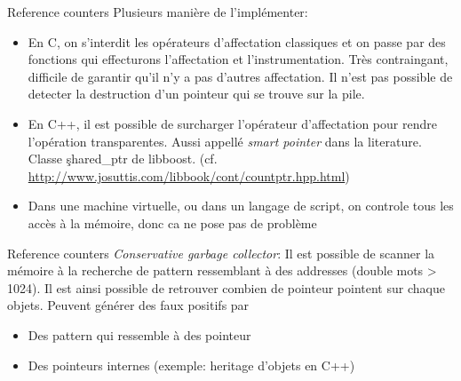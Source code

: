 \begin{frame}[fragile=singleslide]{Reference counters}
  Plusieurs manière de l'implémenter:
  \begin{itemize}
  \item En C, on s'interdit les opérateurs d'affectation classiques et
    on  passe  par  des  fonctions qui  effecturons  l'affectation  et
    l'instrumentation.  Très contraingant, difficile de garantir qu'il
    n'y a pas d'autres affectation.  Il n'est pas possible de detecter
    la destruction d'un pointeur qui se trouve sur la pile.
  \item   En  C++,   il   est  possible   de  surcharger   l'opérateur
    d'affectation   pour  rendre  l'opération   transparentes.   Aussi
    appellé   \emph{smart  pointer}   dans   la  literature.    Classe
    \c{shared_ptr}            de            libboost.             (cf.
    \url{http://www.josuttis.com/libbook/cont/countptr.hpp.html})
  \item Dans une  machine virtuelle, ou dans un  langage de script, on
    controle  tous les  accès à  la mémoire,  donc ca  ne pose  pas de
    problème
  \end{itemize}
\end{frame}  

\begin{frame}[fragile=singleslide]{Reference counters}
  \emph{Conservative garbage collector}: Il est possible de scanner la
  mémoire  à  la recherche  de  pattern  ressemblant  à des  addresses
  (double mots > 1024).  Il est ainsi possible de retrouver combien de
  pointeur  pointent  sur  chaque  objets. Peuvent  générer  des  faux
  positifs par
  \begin{itemize} 
  \item Des pattern qui ressemble à des pointeur
  \item Des pointeurs internes (exemple: heritage d'objets en C++)
  \end{itemize} 
\end{frame}

